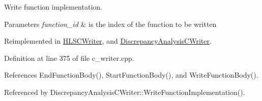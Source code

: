 Write function implementation. 


\begin{DoxyParams}{Parameters}
{\em function\+\_\+id} & is the index of the function to be written \\
\hline
\end{DoxyParams}


Reimplemented in \hyperlink{classHLSCWriter_a2379e428afbccc4b235dca4ae28dbaf5}{H\+L\+S\+C\+Writer}, and \hyperlink{classDiscrepancyAnalysisCWriter_a544a8f99622f86cfbcc2eae9a83d4e64}{Discrepancy\+Analysis\+C\+Writer}.



Definition at line 375 of file c\+\_\+writer.\+cpp.



References End\+Function\+Body(), Start\+Function\+Body(), and Write\+Function\+Body().



Referenced by Discrepancy\+Analysis\+C\+Writer\+::\+Write\+Function\+Implementation().


